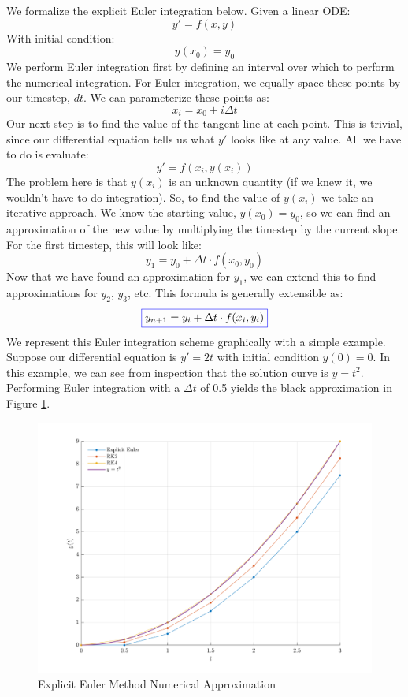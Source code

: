 \documentclass[12pt]{report}
\begin{document}
{We formalize the explicit Euler integration below. Given a linear ODE:
$$y'=f\left(x,y\right)$$
With initial condition:
$$y(x_0)=y_0$$
We perform Euler integration first by defining an interval over which to perform the numerical integration. For Euler integration, we equally space these points by our timestep, $dt$. We can parameterize these points as:
$$x_i=x_0+i\Delta t$$
Our next step is to find the value of the tangent line at each point. This is trivial, since our differential equation tells us what $y'$ looks like at any value. All we have to do is evaluate:
$$y'=f\left(x_i,y(x_i)\right)$$
The problem here is that $y(x_i)$ is an unknown quantity (if we knew it, we wouldn’t have to do integration). So, to find the value of $y(x_i)$ we take an iterative approach. We know the starting value, $y(x_0)=y_0$, so we can find an approximation of the new value by multiplying the timestep by the current slope. For the first timestep, this will look like:
$$y_1=y_0+\Delta t\cdot f(x_0,y_0)$$
Now that we have found an approximation for $y_1$, we can extend this to find approximations for $y_2$, $y_3$, etc. This formula is generally extensible as:
$$\color{blue}\boxed{\color{black}y_{n+1}=y_i+\Delta t \cdot f(x_i,y_i)}$$
We represent this Euler integration scheme graphically with a simple example. Suppose our differential equation is $y'=2t$ with initial condition $y(0)=0$. In this example, we can see from inspection that the solution curve is $y=t^2$. Performing Euler integration with a $\Delta t$ of 0.5 yields the black approximation in Figure \ref{fig:Euler}.
\begin{figure}[ht]
    \centering
    
\includegraphics[width=\linewidth]{6DoF Explanation Scripts/Explicit Euler Approximation Figure.png}
    \caption{Explicit Euler Method Numerical Approximation}
    \label{fig:Euler}
\end{figure}

}
\end{document}
